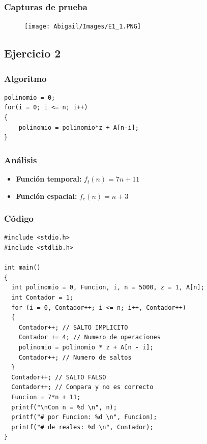 \documentclass[12pt]{article}
\begin{document}
    		\subsubsection{Capturas de prueba}
    			\begin{figure}[h!]
	                \centering
	                \texttt{[image: Abigail/Images/E1\_1.PNG]}
	 		    \end{figure} 

	    \subsection{Ejercicio 2}
		    \subsubsection{Algoritmo}
	        \begin{lstlisting}[style=Java]
polinomio = 0;
for(i = 0; i <= n; i++)
{
	polinomio = polinomio*z + A[n-i];
}
    		\end{lstlisting}

    		\subsubsection{Análisis}
    			\begin{itemize}
    				\item[\Checkmark] \textbf{Función temporal:} $f_{t}(n) = 7n + 11$
    				\item[\Checkmark] \textbf{Función espacial:} $f_{e}(n) = n + 3$
    			\end{itemize}
    		\subsubsection{Código}
    		\begin{lstlisting}[style=Java]
#include <stdio.h>
#include <stdlib.h>

int main() 
{
  int polinomio = 0, Funcion, i, n = 5000, z = 1, A[n];
  int Contador = 1;
  for (i = 0, Contador++; i <= n; i++, Contador++) 
  {
    Contador++; // SALTO IMPLICITO
    Contador += 4; // Numero de operaciones
    polinomio = polinomio * z + A[n - i];
    Contador++; // Numero de saltos
  }
  Contador++; // SALTO FALSO
  Contador++; // Compara y no es correcto
  Funcion = 7*n + 11;
  printf("\nCon n = %d \n", n); 
  printf("# por Funcion: %d \n", Funcion);
  printf("# de reales: %d \n", Contador);
}
	   		\end{lstlisting}
\end{document}
